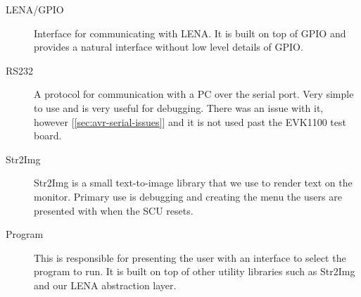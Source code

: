 \begin{description}
\item[LENA/GPIO] Interface for communicating with \ac{LENA}. It is built on
  top of GPIO and provides a natural interface without low level details of GPIO.


\item[RS232] A protocol for communication with a PC over the serial port. Very
  simple to use and is very useful for debugging. There was an issue with it,
  however [\ref{sec:avr-serial-issues}] and it is not used past the EVK1100 test
  board.
 


\item[Str2Img] Str2Img is a small text-to-image library that we use to render
  text on the monitor. Primary use is debugging and creating the menu the users
  are presented with when the SCU resets.
  
\item[Program] This is responsible for presenting the user with an interface to
  select the program to run. It is built on top of other utility libraries such
  as Str2Img and our \ac{LENA} abstraction layer.



\end{description}
